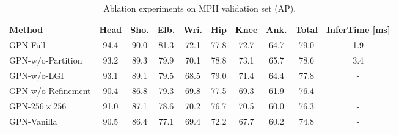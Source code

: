 \documentclass[10pt,twocolumn,letterpaper]{article}
\begin{document}
\begin{table}[t!]\scriptsize%
  \caption{Ablation experiments on MPII validation set (AP).}
  \label{tab:ablation_analysis}
  \centering
  \setlength{\tabcolsep}{1.5pt}
  \begin{tabular}{lccccccccc}
    \toprule
     Method   &Head & Sho. & Elb. & Wri. & Hip & Knee  & Ank. & Total & InferTime [ms]\\
     \midrule
     GPN-Full & 94.4 & 90.0     & 81.3  & 72.1 & 77.8 & 72.7 & 64.7  & 79.0 & 1.9\\
     \midrule
     GPN-w/o-Partition & 93.2 & 89.3     & 79.9  & 70.1 & 78.8 & 73.1 & 65.7  & 78.6  & 3.4\\
     GPN-w/o-LGI & 93.1 & 89.1     & 79.5  & 68.5 & 79.0 & 71.4 & 64.4  & 77.8 & - \\
     GPN-w/o-Refinement & 90.4 & 86.8     & 79.3  & 69.8 & 77.5 & 69.3 & 61.9  & 76.4 & -\\
     GPN-$256{\times}256$ & 91.0 & 87.1     & 78.6  & 70.2 & 76.7 & 70.5 & 60.0  & 76.3 & -\\
     GPN-Vanilla & 90.5 & 86.4 & 77.1  & 69.4 & 72.2 & 67.7 & 60.2  & 74.8 & - \\
     \bottomrule
  \end{tabular}
\end{table}

\end{document}

